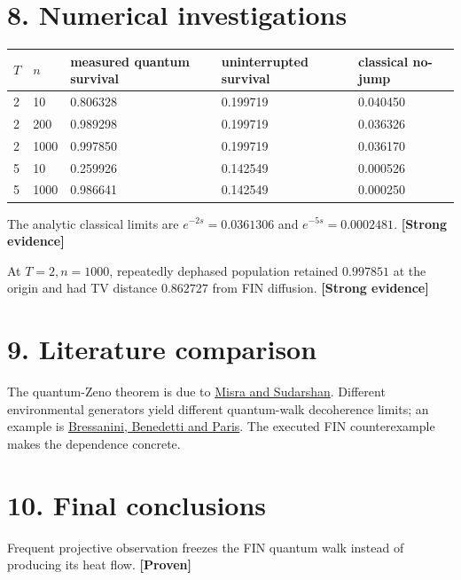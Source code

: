 \documentclass[11pt,a4paper,openany]{report}
\newcommand{\statusProven}{\textcolor{fingreen}{[Proven]}}
\newcommand{\statusStrong}{\textcolor{finblue}{[Strong evidence]}}
\begin{document}
\section{8. Numerical investigations}

\begin{center}
\begingroup\footnotesize
\setlength{\tabcolsep}{3.5pt}
\renewcommand{\arraystretch}{1.16}
\begin{longtable}{@{}p{}p{}p{}p{}p{}@{}}
\toprule
\textbf{\(T\)} & \textbf{\(n\)} & \textbf{measured quantum survival} & \textbf{uninterrupted survival} & \textbf{classical no-jump} \\
\midrule
\endhead
2 & 10 & 0.806328 & 0.199719 & 0.040450 \\
2 & 200 & 0.989298 & 0.199719 & 0.036326 \\
2 & 1000 & 0.997850 & 0.199719 & 0.036170 \\
5 & 10 & 0.259926 & 0.142549 & 0.000526 \\
5 & 1000 & 0.986641 & 0.142549 & 0.000250 \\
\bottomrule
\end{longtable}
\endgroup
\end{center}

The analytic classical limits are \(e^{-2s}=0.0361306\) and \(e^{-5s}=0.0002481\). \textbf{\statusStrong{}}

At \(T=2,n=1000\), repeatedly dephased population retained \(0.997851\) at the origin and had TV distance \(0.862727\) from FIN diffusion. \textbf{\statusStrong{}}

\section{9. Literature comparison}

The quantum-Zeno theorem is due to \href{https://doi.org/10.1063/1.523304}{Misra and Sudarshan}. Different environmental generators yield different quantum-walk decoherence limits; an example is \href{https://doi.org/10.1007/s11128-022-03647-x}{Bressanini, Benedetti and Paris}. The executed FIN counterexample makes the dependence concrete.

\section{10. Final conclusions}

Frequent projective observation freezes the FIN quantum walk instead of producing its heat flow. \textbf{\statusProven{}}
\end{document}
